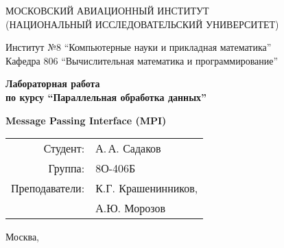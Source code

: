 \begin{titlepage}
\begin{center}

МОСКОВСКИЙ АВИАЦИОННЫЙ ИНСТИТУТ\\ (НАЦИОНАЛЬНЫЙ ИССЛЕДОВАТЕЛЬСКИЙ УНИВЕРСИТЕТ)

\vspace{18pt}

Институт №8 \enquote{Компьютерные науки и прикладная математика}\\
Кафедра 806 \enquote{Вычислительная математика и программирование}


\vspace{68pt}
\textbf{
Лабораторная работа \\ по курсу \enquote{Параллельная обработка данных}
}

\vspace{48pt}
\textbf{
Message Passing Interface (MPI)
}

\end{center}

\vspace{160pt}

\begin{flushright}
\begin{tabular}{rl}
Студент: & А.\,А. Садаков \\
Группа: & 8О-406Б \\
Преподаватели: & К.Г. Крашенинников,\\
 & А.Ю. Морозов\\
\end{tabular}
\end{flushright}

\vfill

\begin{center}
Москва, \the\year
\end{center}
\end{titlepage}

\pagebreak
